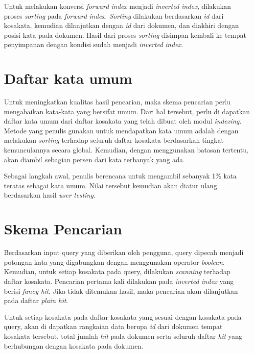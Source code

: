 Untuk melakukan konversi \textit{forward index} menjadi \textit{inverted index},
dilakukan proses \textit{sorting} pada \textit{forward index}. \textit{Sorting}
dilakukan berdasarkan \textit{id} dari kosakata, kemudian dilanjutkan dengan
\textit{id} dari dokumen, dan diakhiri dengan posisi kata pada dokumen. Hasil
dari proses \textit{sorting} disimpan kembali ke tempat penyimpanan dengan
kondisi sudah menjadi \textit{inverted index}.

\section{Daftar kata umum}

Untuk meningkatkan kualitas hasil pencarian, maka skema pencarian perlu
mengabaikan kata-kata yang bersifat umum. Dari hal tersebut, perlu di dapatkan
daftar kata umum dari daftar kosakata yang telah dibuat oleh modul
\textit{indexing}. Metode yang penulis gunakan untuk mendapatkan kata umum
adalah dengan melakukan \textit{sorting} terhadap seluruh daftar kosakata
berdasarkan tingkat kemunculannya secara global. Kemudian, dengan menggunakan
batasan tertentu, akan diambil sebagian persen dari kata terbanyak yang ada.

Sebagai langkah awal, penulis berencana untuk mengambil sebanyak 1\% kata
teratas sebagai kata umum. Nilai tersebut kemudian akan diatur ulang berdasarkan
hasil \textit{user testing}.

\section{Skema Pencarian}


Berdasarkan input query yang diberikan oleh pengguna, query dipecah menjadi
potongan kata yang digabungkan dengan menggunakan operator \textit{boolean}.
Kemudian, untuk setiap kosakata pada query, dilakukan \textit{scanning} terhadap
daftar kosakata. Pencarian pertama kali dilakukan pada \textit{inverted index}
yang berisi \textit{fancy hit}. Jika tidak ditemukan hasil, maka pencarian akan
dilanjutkan pada daftar \textit{plain hit}.

Untuk setiap kosakata pada daftar kosakata yang sesuai dengan kosakata pada
query, akan di dapatkan rangkaian data berupa \textit{id} dari dokumen tempat
kosakata tersebut, total jumlah \textit{hit} pada dokumen serta seluruh daftar
\textit{hit} yang berhubungan dengan kosakata pada dokumen.


